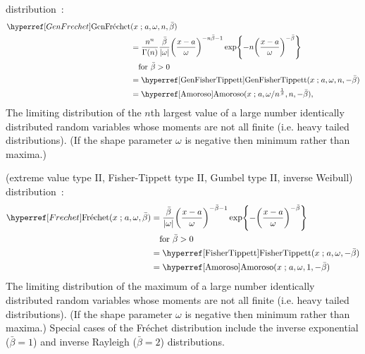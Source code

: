  distribution~\cite{Smirnov1949,Barndorff-Nielsen1963}:
\begin{align}
\label{GenFrechet}
\GenFrechet&(x \given a , \omega, n, \bar{\beta}) 
\\
 \notag 
&=	\frac{n^n}{\Gamma(n)}  \frac{\bar{\beta}}{| \omega |} \Left(\frac{x-a }{\omega}\Right)^{-n\bar{\beta}-1} 
\exp\Left\{-n\Left(\frac{x-a }{\omega}\Right)^{-\bar{\beta}}\Right\} 
\checked
\\ &\quad \text{for } \bar{\beta}>0  \notag
\\ \notag
& = \opr{GenFisherTippett}(x\given a, \omega, n, -\bar{\beta})
\checked
\\ \notag
&= \opr{Amoroso}(x\given  a , {\omega}/{n^{\frac{1}{\beta} }},n,-\bar{\beta}),
\checked
\end{align}
The limiting distribution of the $n$th largest value of a large number identically distributed random variables whose moments are not all finite (i.e. heavy tailed distributions).  (If the shape parameter $\omega$ is negative then minimum rather than maxima.)


 (extreme value type II, Fisher-Tippett type II, Gumbel type II, inverse Weibull) distribution~\cite{Frechet1927,Gumbel1958}:
\begin{align}
\label{Frechet}
\Frechet(x \given a , \omega, \bar{\beta}) 
&=	\frac{\bar{\beta}}{| \omega |} \Left(\frac{x-a }{\omega}\Right)^{-\bar{\beta}-1} 
\exp\Left\{-\Left(\frac{x-a }{\omega}\Right)^{-\bar{\beta}}\Right\} \checked
\\ \notag &\quad \text{for } \bar{\beta}>0 \checked
\\  \notag
& = \opr{FisherTippett}(x\given  a, \omega, -\bar{\beta}) \checked
\\ \notag 
&= \opr{Amoroso}(x\given  a , \omega,1,-\bar{\beta})\notag \checked
\end{align}
The limiting distribution of the maximum of a large number identically distributed random variables whose moments are not all finite (i.e. heavy tailed distributions).  (If the shape parameter $\omega$ is negative then minimum rather than maxima.)
Special cases of the Fr\'{e}chet  distribution include the inverse exponential ($\bar{\beta}=1$) and inverse Rayleigh ($\bar{\beta}=2$) distributions.
 








